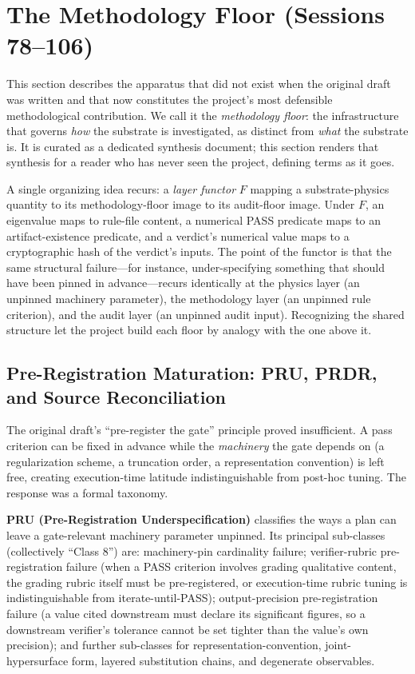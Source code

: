 \documentclass[12pt,a4paper]{article}
\begin{document}
\section{The Methodology Floor (Sessions 78--106)}
\label{sec:floor}

This section describes the apparatus that did not exist when the original draft was written and that now constitutes the project's most defensible methodological contribution. We call it the \emph{methodology floor}: the infrastructure that governs \emph{how} the substrate is investigated, as distinct from \emph{what} the substrate is. It is curated as a dedicated synthesis document; this section renders that synthesis for a reader who has never seen the project, defining terms as it goes.

A single organizing idea recurs: a \emph{layer functor} $F$ mapping a substrate-physics quantity to its methodology-floor image to its audit-floor image. Under $F$, an eigenvalue maps to rule-file content, a numerical PASS predicate maps to an artifact-existence predicate, and a verdict's numerical value maps to a cryptographic hash of the verdict's inputs. The point of the functor is that the same structural failure---for instance, under-specifying something that should have been pinned in advance---recurs identically at the physics layer (an unpinned machinery parameter), the methodology layer (an unpinned rule criterion), and the audit layer (an unpinned audit input). Recognizing the shared structure let the project build each floor by analogy with the one above it.

\subsection{Pre-Registration Maturation: PRU, PRDR, and Source Reconciliation}
\label{sec:floor-pru}

The original draft's ``pre-register the gate'' principle proved insufficient. A pass criterion can be fixed in advance while the \emph{machinery} the gate depends on (a regularization scheme, a truncation order, a representation convention) is left free, creating execution-time latitude indistinguishable from post-hoc tuning. The response was a formal taxonomy.

\textbf{PRU (Pre-Registration Underspecification)} classifies the ways a plan can leave a gate-relevant machinery parameter unpinned. Its principal sub-classes (collectively ``Class 8'') are: machinery-pin cardinality failure; verifier-rubric pre-registration failure (when a PASS criterion involves grading qualitative content, the grading rubric itself must be pre-registered, or execution-time rubric tuning is indistinguishable from iterate-until-PASS); output-precision pre-registration failure (a value cited downstream must declare its significant figures, so a downstream verifier's tolerance cannot be set tighter than the value's own precision); and further sub-classes for representation-convention, joint-hypersurface form, layered substitution chains, and degenerate observables.
\end{document}
